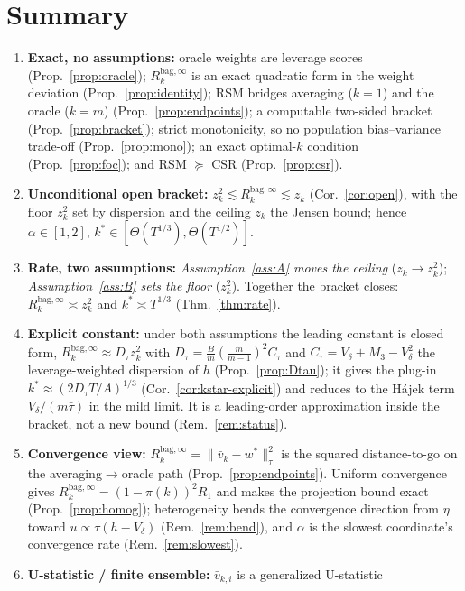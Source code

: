 \documentclass[11pt]{article}
\newcommand{\Rk}{R_k^{\mathrm{bag},\infty}}
\begin{document}
\section{Summary}
\begin{enumerate}
\item \textbf{Exact, no assumptions:} oracle weights are leverage scores
(Prop.~\ref{prop:oracle}); $\Rk$ is an exact quadratic form in the weight deviation
(Prop.~\ref{prop:identity}); RSM bridges averaging ($k=1$) and the oracle ($k=m$)
(Prop.~\ref{prop:endpoints}); a computable two-sided bracket
(Prop.~\ref{prop:bracket}); strict monotonicity, so no population bias--variance
trade-off (Prop.~\ref{prop:mono}); an exact optimal-$k$ condition
(Prop.~\ref{prop:foc}); and RSM $\succeq$ CSR (Prop.~\ref{prop:csr}).
\item \textbf{Unconditional open bracket:} $z_k^2\lesssim\Rk\lesssim z_k$
(Cor.~\ref{cor:open}), with the floor $z_k^2$ set by dispersion and the ceiling $z_k$ the
Jensen bound; hence $\alpha\in[1,2]$, $k^\ast\in[\Theta(T^{1/3}),\Theta(T^{1/2})]$.
\item \textbf{Rate, two assumptions:} \emph{Assumption~\ref{ass:A} moves the ceiling}
($z_k\to z_k^2$); \emph{Assumption~\ref{ass:B} sets the floor} ($z_k^2$). Together the
bracket closes: $\Rk\asymp z_k^2$ and $k^\ast\asymp T^{1/3}$ (Thm.~\ref{thm:rate}).
\item \textbf{Explicit constant:} under both assumptions the leading constant is closed
form, $\Rk\approx D_\tau z_k^2$ with $D_\tau=\frac{B}{m}(\frac{m}{m-1})^2C_\tau$ and
$C_\tau=V_\delta+M_3-V_\delta^2$ the leverage-weighted dispersion of $h$
(Prop.~\ref{prop:Dtau}); it gives the plug-in $k^\ast\approx(2D_\tau T/A)^{1/3}$
(Cor.~\ref{cor:kstar-explicit}) and reduces to the H\'ajek term $V_\delta/(m\bar\tau)$ in
the mild limit. It is a leading-order approximation inside the bracket, not a new bound
(Rem.~\ref{rem:status}).
\item \textbf{Convergence view:} $\Rk=\|\bar v_k-w^\ast\|_\tau^2$ is the squared
distance-to-go on the averaging$\to$oracle path (Prop.~\ref{prop:endpoints}). Uniform
convergence gives $\Rk=(1-\pi(k))^2R_1$ and makes the projection bound exact
(Prop.~\ref{prop:homog}); heterogeneity bends the convergence direction from $\eta$ toward
$u\propto\tau(h-V_\delta)$ (Rem.~\ref{rem:bend}), and $\alpha$ is the slowest coordinate's
convergence rate (Rem.~\ref{rem:slowest}).
\item \textbf{U-statistic / finite ensemble:} $\bar v_{k,i}$ is a generalized U-statistic

\end{enumerate}
\end{document}
